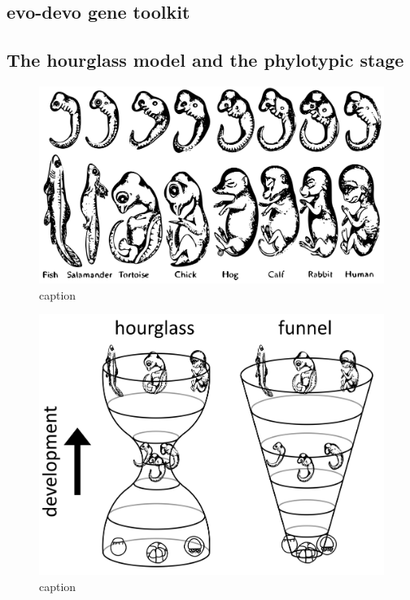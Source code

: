 \subsection{evo-devo gene toolkit}

\subsection{The hourglass model and the phylotypic stage}



\begin{figure}[H]
    \includegraphics[width=\linewidth]{ch1.Introduction/imgs/haeckel.png}
    \caption{caption}
    \label{fig:haeckel}
\end{figure}

\begin{figure}[H]
    \includegraphics[width=\linewidth]{ch1.Introduction/imgs/hourglass.png}
    \caption{caption}
    \label{fig:hourglass}
\end{figure}

